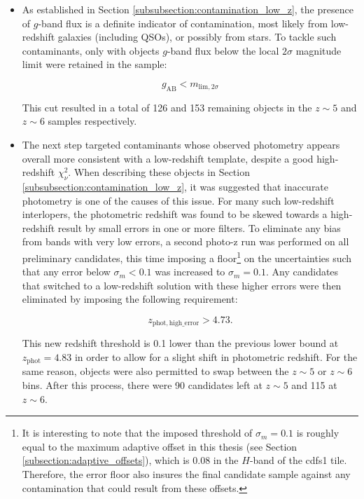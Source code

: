 \begin{itemize}
\item{} As established in Section \ref{subsubsection:contamination_low_z}, the presence of $g$-band flux is a definite indicator of contamination, most likely from low-redshift galaxies (including QSOs), or possibly from stars. To tackle such contaminants, only with objects $g$-band flux below the local $2\sigma$ magnitude limit were retained in the sample: 

\begin{equation}
    g_{\mathrm{AB}} <  m_{\mathrm{lim}, 2\sigma}
\end{equation}

\noindent This cut resulted in a total of 126 and 153 remaining objects in the $z\sim5$ and $z\sim6$ samples respectively. 

\item{} The next step targeted contaminants whose observed photometry appears overall more consistent with a low-redshift template, despite a good high-redshift $\chi^{2}_{\nu}$. When describing these objects in Section \ref{subsubsection:contamination_low_z}, it was suggested that inaccurate photometry is one of the causes of this issue. For many such low-redshift interlopers, the photometric redshift was found to be skewed towards a high-redshift result by small errors in one or more filters. To eliminate any bias from bands with very low errors, a second photo-z run was performed on all preliminary candidates, this time imposing a floor\footnote{It is interesting to note that the imposed threshold of $\sigma_{m}=0.1$ is roughly equal to the maximum adaptive offset in this thesis (see Section \ref{subsection:adaptive_offsets}), which is 0.08 in the $H$-band of the cdfs1 tile. Therefore, the error floor also insures the final candidate sample against any contamination that could result from these offsets.} on the uncertainties such that any error below $\sigma_{m}<0.1$ was increased to $\sigma_{m}=0.1$. Any candidates that switched to a low-redshift solution with these higher errors were then eliminated by imposing the following requirement:  

\begin{equation}
     z_{\mathrm{phot,high\_error}} > 4.73.\label{eqn:high_error_cut}
\end{equation}

\noindent This new redshift threshold is 0.1 lower than the previous lower bound at $z_{\mathrm{phot}}=4.83$ in order to allow for a slight shift in photometric redshift. For the same reason, objects were also permitted to swap between the $z\sim5$ or $z\sim6$ bins. After this process, there were 90 candidates left at $z\sim5$ and 115  at $z\sim6$. 




\end{itemize}
